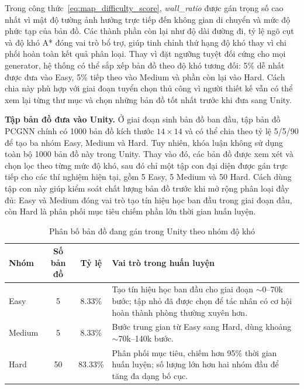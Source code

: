 Trong công thức~\ref{eq:map_difficulty_score}, \emph{wall\_ratio} được gán trọng số cao nhất vì mật độ tường ảnh hưởng trực tiếp đến không gian di chuyển và mức độ phức tạp của bản đồ. Các thành phần còn lại như độ dài đường đi, tỷ lệ ngõ cụt và độ khó A* đóng vai trò bổ trợ, giúp tinh chỉnh thứ hạng độ khó thay vì chi phối hoàn toàn kết quả phân loại. Thay vì đặt ngưỡng tuyệt đối cứng cho mọi generator, hệ thống có thể sắp xếp bản đồ theo độ khó tương đối: 5\% dễ nhất được đưa vào Easy, 5\% tiếp theo vào Medium và phần còn lại vào Hard. Cách chia này phù hợp với giai đoạn tuyển chọn thủ công vì người thiết kế vẫn có thể xem lại từng thư mục và chọn những bản đồ tốt nhất trước khi đưa sang Unity.

\textbf{Tập bản đồ đưa vào Unity.} Ở giai đoạn sinh bản đồ ban đầu, tập bản đồ PCGNN chính có 1000 bản đồ kích thước $14\times14$ và có thể chia theo tỷ lệ 5/5/90 để tạo ba nhóm Easy, Medium và Hard. Tuy nhiên, khóa luận không sử dụng toàn bộ 1000 bản đồ này trong Unity. Thay vào đó, các bản đồ được xem xét và chọn lọc theo từng mức độ khó, sau đó chỉ một tập con đại diện được gán trực tiếp cho các thí nghiệm hiện tại, gồm 5 Easy, 5 Medium và 50 Hard. Cách dùng tập con này giúp kiểm soát chất lượng bản đồ trước khi mở rộng phân loại đầy đủ: Easy và Medium đóng vai trò tạo tín hiệu học ban đầu trong giai đoạn đầu, còn Hard là phân phối mục tiêu chiếm phần lớn thời gian huấn luyện.

\begin{table}[H]
    \centering
    \small
    \caption{Phân bố bản đồ đang gán trong Unity theo nhóm độ khó}
    \label{tab:map_split}
    \begin{tabular}{|p{2.5cm}|c|c|p{7.5cm}|}
        \hline
        \textbf{Nhóm} & \textbf{Số bản đồ} & \textbf{Tỷ lệ} & \textbf{Vai trò trong huấn luyện} \\
        \hline
        Easy   & 5  & 8.33\%  & Tạo tín hiệu học ban đầu cho giai đoạn $\sim$0--70k bước; tập nhỏ đã được chọn để tác nhân có cơ hội hoàn thành phòng thường xuyên hơn. \\
        \hline
        Medium & 5  & 8.33\%  & Bước trung gian từ Easy sang Hard, dùng khoảng $\sim$70k--140k bước. \\
        \hline
        Hard   & 50 & 83.33\% & Phân phối mục tiêu, chiếm hơn 95\% thời gian huấn luyện; số lượng lớn hơn hai nhóm đầu để tăng đa dạng bố cục. \\
        \hline
    \end{tabular}
\end{table}

